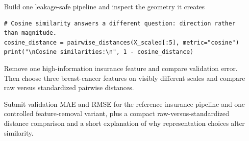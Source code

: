 \begin{labproject}{Build one leakage-safe pipeline and inspect the geometry it creates}
\begin{lstlisting}[style=mlpython]
# Cosine similarity answers a different question: direction rather than magnitude.
cosine_distance = pairwise_distances(X_scaled[:5], metric="cosine")
print("\nCosine similarities:\n", 1 - cosine_distance)
\end{lstlisting}

\begin{tryit}
Remove one high-information insurance feature and compare validation error. Then choose three breast-cancer features on visibly different scales and compare raw versus standardized pairwise distances.
\end{tryit}
\end{labproject}

\begin{labdeliverable}
Submit validation MAE and RMSE for the reference insurance pipeline and one controlled feature-removal variant, plus a compact raw-versus-standardized distance comparison and a short explanation of why representation choices alter similarity.
\end{labdeliverable}
